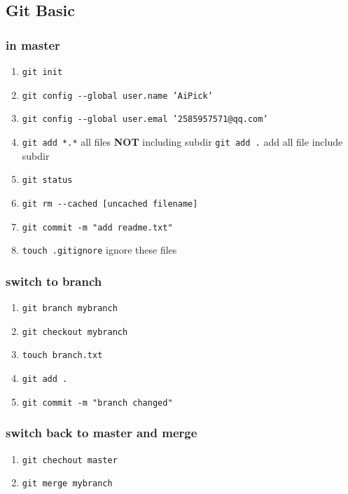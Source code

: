 \documentclass[11pt]{article}
\begin{document}
\subsection{Git Basic}
\label{sec:org9214d94}
\subsubsection{in master}
\label{sec:org8573392}
\begin{enumerate}
\item \texttt{git init}
\item \texttt{git config -{}-global user.name 'AiPick'}
\item \texttt{git config -{}-global user.emal '2585957571@qq.com'}
\item \texttt{git add *.*} all files \textbf{NOT} including subdir
\texttt{git add .}  add all file include subdir
\item \texttt{git status}
\item \texttt{git rm -{}-cached [uncached filename]}
\item \texttt{git commit -m "add readme.txt"}
\item \texttt{touch .gitignore} ignore these files
\end{enumerate}
\subsubsection{switch to branch}
\label{sec:orgeb76236}
\begin{enumerate}
\item \texttt{git branch mybranch}
\item \texttt{git checkout mybranch}
\item \texttt{touch branch.txt}
\item \texttt{git add .}
\item \texttt{git commit -m "branch changed"}
\end{enumerate}
\subsubsection{switch back to master and merge}
\label{sec:org18441b5}
\begin{enumerate}
\item \texttt{git chechout master}
\item \texttt{git merge mybranch}
\end{enumerate}
\end{document}
